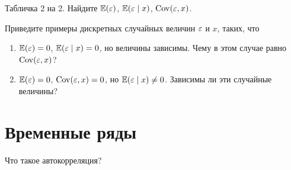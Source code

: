 \documentclass[pdftex,11pt,openany]{book}\usepackage[]{graphicx}\usepackage[]{color}
\begin{document}
\begin{solution}
\end{solution}

\begin{problem}
Табличка 2 на 2. Найдите $\mathbb{E}(\varepsilon)$, $\mathbb{E}(\varepsilon \mid x)$, $\operatorname{Cov}(\varepsilon,x)$.
\end{problem}

\begin{solution}
\end{solution}

\begin{problem}
Приведите примеры дискретных случайных величин $\varepsilon$ и $x$, таких, что
\begin{enumerate}
\item $\mathbb{E}(\varepsilon)=0$, $\mathbb{E}(\varepsilon\mid x)=0$, но величины зависимы. Чему в этом случае равно $\operatorname{Cov}(\varepsilon,x)$?
\item $\mathbb{E}(\varepsilon)=0$, $\operatorname{Cov}(\varepsilon,x)=0$, но $\mathbb{E}(\varepsilon\mid x)\neq 0$. Зависимы ли эти случайные величины? 
\end{enumerate}
\end{problem}

\begin{solution}
\end{solution}




\chapter{Временные ряды}


\begin{problem}
Что такое автокорреляция?
\end{problem}

\begin{solution}
\end{solution}
\end{document}
